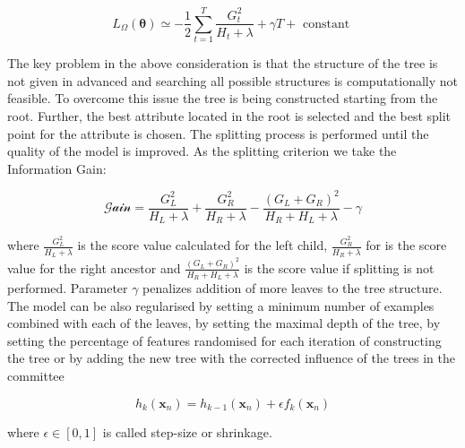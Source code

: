 \begin{equation}
L_{\Omega}(\boldsymbol{\theta}) \simeq-\frac{1}{2} \sum_{t=1}^{T} \frac{G_{t}^{2}}{H_{t}+\lambda}+\gamma T+\text { constant }
\end{equation}


The key problem in the above consideration is that the structure of the tree is not given in advanced and searching all possible structures is computationally not feasible. To overcome this issue the tree is being constructed starting from the root. Further, the best attribute located in the root is selected and the best split point for the attribute is chosen. The splitting process is performed until the quality of the model is improved. As the splitting criterion we take the Information Gain:

\begin{equation}
\label{eqn:Gain}
\mathscr{Gain}=\frac{G_{L}^{2}}{H_{L}+\lambda}+\frac{G_{R}^{2}}{H_{R}+\lambda}-\frac{\left(G_{L}+G_{R}\right)^{2}}{H_{R}+H_{L}+\lambda}-\gamma
\end{equation}

where $\frac{G_{L}^{2}}{H_{L}+\lambda}$ is the score value calculated for the left child, $\frac{G_{R}^{2}}{H_{R}+\lambda}$ for is the score value for the right ancestor and $\frac{\left(G_{L}+G_{R}\right)^{2}}{H_{R}+H_{L}+\lambda}$ is the score value if splitting is not performed. Parameter $\gamma$ penalizes addition of more leaves to the tree structure.
The model can be also regularised by setting a minimum number of examples combined with each of the leaves, by setting the maximal depth of the tree, by setting the percentage of features randomised for each iteration of constructing the tree or by adding the new tree with the corrected influence of the trees in the committee

\begin{equation}
h_{k}\left(\mathbf{x}_{n}\right)=h_{k-1}\left(\mathbf{x}_{n}\right)+\epsilon f_{k}\left(\mathbf{x}_{n}\right)
\end{equation}

where $\epsilon \in[0,1]$ is called step-size or shrinkage.



